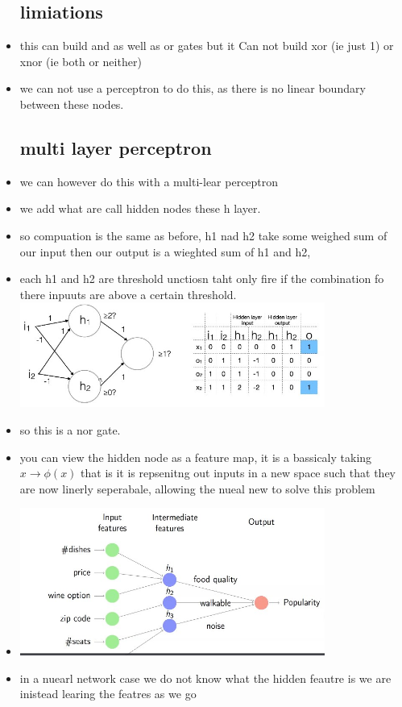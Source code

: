 \documentclass{article}
\begin{document}
\begin{itemize}
\subsection{limiations}
\item this can build and as well as or gates but it Can not build xor (ie just 1) or xnor (ie both or neither)   
\item we can not use a perceptron to do this, as there is no linear boundary between these nodes. 
\subsection{multi layer perceptron }
\item we can however do this with a multi-lear perceptron 
\item we add what are call hidden nodes these h layer. 
\item so compuation is the same as before, h1 nad h2 take some weighed sum of our input then our output is a wieghted sum of h1 and h2,
\item each h1 and h2 are threshold unctiosn taht only fire if the combination fo there inpuuts are above a certain threshold. \\
\includegraphics[width=10cm]{lecture_notes/lecture_11/immages/l11_3.jpg}
\item so this is a nor gate.
\item you can view the hidden node as a feature map, it is a bassicaly taking $x\rightarrow \phi(x)$ that is it is repsenitng out inputs in a new space such that they are now linerly seperabale, allowing the nueal new to solve this problem 
\item \includegraphics[width=10cm]{lecture_notes/lecture_11/immages/l11_4.jpg}
\item in a nuearl network case we do not know what the hidden feautre is we are inistead learing the featres as we go

\end{itemize}
\end{document}
